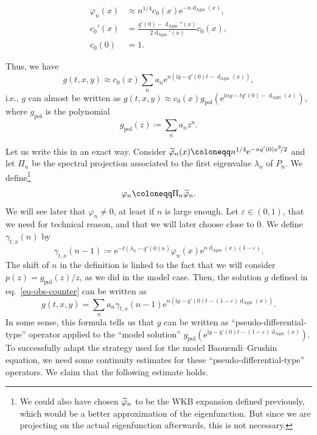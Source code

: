 \documentclass[10pt]{amsart}
\theoremstyle{definition}\newtheorem{defi}[theo]{Definition}\newtheorem{rema}[theo]{Remark}\newtheorem{exam}[theo]{Example}\newtheorem{exem}[theo]{Example}\newtheorem{nota}[theo]{Notation}
\newcommand{\1}{\mathds 1}
\newcommand{\dagmon}{\mathop{\mathrm{d}}\nolimits_{\mathrm{Agm}}}
\newcommand{\eu}{\mathrm e}
\newcommand{\iu}{\mathrm i}
\newcommand{\pol}{{\mathrm{pol}}}
\newcommand{\g}{\gamma}
\newcommand{\e}{\varepsilon}
\renewcommand{\l}{\lambda}
\newcommand{\f}{\varphi}
\let\oldtilde\tilde
\renewcommand*{\tilde}[1]{\mathchoice{\widetilde{#1}}{\widetilde{#1}}{\oldtilde{#1}}{\oldtilde{#1}}}
\begin{document}
\begin{equation}\label{eq-WKB-selfadjoint}
\begin{split}
\f_n(x) &\approx n^{1/4} c_0(x) \eu^{-n \dagmon(x)},\\
c_0'(x) &= \frac{q'(0) - \dagmon''(x)}{2\dagmon'(x)}c_0(x),\\
c_0(0) &= 1.
\end{split}
\end{equation}

Thus, we have
\begin{equation}\label{eq-obs-counter-approx}
g(t,x,y) \approx c_0(x)\sum_n a_{n} \eu^{n\left(\iu y - q'(0)t - \dagmon(x)\right)},
\end{equation}
i.e., $g$ can almost be written as $g(t,x,y) \approx c_0(x)g_\pol(\eu^{\iu n y -t q'(0) -\dagmon(x)})$, where $g_\pol$ is the polynomial
\[
g_\pol(z) \coloneqq \sum_n a_{n} z^n.
\]

Let us write this in an exact way. Consider $\tilde \f_n(x) \coloneqq n^{1/4} \eu^{-nq'(0)x^2\!/2}$ and let $\Pi_n$ be the spectral projection associated to the first eigenvalue $\l_n$ of $P_n$. We define\footnote{
We could also have chosen $\tilde \f_n$ to be the WKB expansion defined previously, which would be a better approximation of the eigenfunction. But since we are projecting on the actual eigenfunction afterwards, this is not necessary.
}
\begin{equation}\label{eq-def-vn}
\f_n \coloneqq \Pi_n \tilde \f_n.
\end{equation}
We will see later that $\f_n\neq 0$, at least if $n$ is large enough. Let $\e\in (0,1)$, that we need for technical reason, and that we will later choose close to 0. We define $\g_{t,x}(n)$ by
\begin{equation}\label{eq-def-gamma-tx}
\g_{t,x}(n-1) \coloneqq \eu^{-t(\l_n - q'(0)n)} \f_n(x)\eu^{n\dagmon(x)(1-\e)}.
\end{equation}
The shift of $n$ in the definition is linked to the fact that we will consider $p(z) = g_\pol(z)/z$, as we did in the model case. Then, the solution $g$ defined in eq.~\eqref{eq-obs-counter} can be written as
\begin{equation}\label{eq-obs-counter-exact}
g(t,x,y) = \sum_n a_{n} \g_{t,x}(n-1)\eu^{n\left(\iu y - q'(0)t - (1-\e)\dagmon(x)\right)}.
\end{equation}
In some sense, this formula tells us that $g$ can be written as ``pseudo-differential-type'' operator applied to the ``model solution'' $g_\pol(\eu^{\iu y - q'(0)t -(1-\e)\dagmon(x)})$. To successfully adapt the strategy used for the model Baouendi--Grushin equation, we need some continuity estimates for these ``pseudo-differential-type'' operators. We claim that the following estimate holds.
\end{document}
